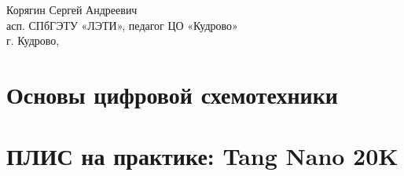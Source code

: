 \documentclass[
    fontsize=12pt,
    headings=big,
    numbers=noenddot,
    toc=listof,
    headinclude=true,
    footinclude=false,
    open=any,
    oneside
]{scrreprt}
\begin{document}
\begin{titlepage}
\vfill
\begin{center}
{\sffamily\large Корягин Сергей Андреевич}\\[2mm]
{\sffamily\small асп. СПбГЭТУ «ЛЭТИ», педагог ЦО «Кудрово»}\\[8mm]
{\sffamily г. Кудрово, \the\year}
\end{center}
\end{titlepage}

\tableofcontents



\part{Основы цифровой схемотехники}










\part{ПЛИС на практике: Tang Nano 20K}










\appendix

\end{document}
